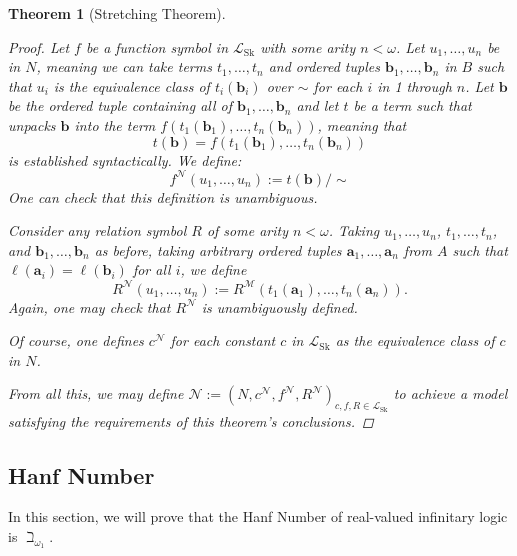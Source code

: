 \documentclass{amsart}
\newtheorem{theorem}{Theorem}[section]
\theoremstyle{definition}
\numberwithin{equation}{theorem}
\newcommand{\V}{\mathbf}
\newcommand{\len}{\ell}
\newcommand{\frag}{\mathcal{L}}
\newcommand{\fragsk}{\frag_{\text{Sk}}}
\begin{document}
\begin{theorem}[Stretching Theorem]
\begin{proof}
    Let $f$ be a function symbol in $\fragsk$ with some arity $n<\omega$.
    Let $u_1,\dots,u_n$ be in $N$, meaning we can take terms $t_1,\dots,t_n$ and ordered tuples $\V b_1,\dots,\V b_n$ in $B$ such that $u_i$ is the equivalence class of $t_i(\V b_i)$ over $\sim$ for each $i$ in 1 through $n$.
    Let $\V b$ be the ordered tuple containing all of $\V b_1,\dots,\V b_n$ and let $t$ be a term such that unpacks $\V b$ into the term $f(t_1(\V b_1),\dots,t_n(\V b_n))$, meaning that
    \[
      t(\V b)=f(t_1(\V b_1),\dots,t_n(\V b_n))
    \]
    is established syntactically.
    We define:
    \[
      f^\mathcal N(u_1,\dots, u_n):=t(\V b)/{\sim}
    \]
    One can check that this definition is unambiguous.
    
    Consider any relation symbol $R$ of some arity $n<\omega$.
    Taking $u_1,\dots,u_n$, $t_1,\dots,t_n$, and $\V b_1,\dots,\V b_n$ as before,
    taking arbitrary ordered tuples $\V a_1,\dots,\V a_n$ from $A$ such that $\len(\V a_i)=\len(\V b_i)$ for all $i$, we define
    \[
      R^\mathcal N(u_1,\dots,u_n):=R^\mathcal M(t_1(\V a_1),\dots,t_n(\V a_n)).
    \]
    Again, one may check that $R^\mathcal N$ is unambiguously defined.
    
    Of course, one defines $c^\mathcal N$ for each constant $c$ in $\fragsk$ as the equivalence class of $c$ in $N$.
    
    From all this, we may define $\mathcal N:=(N, c^\mathcal N, f^\mathcal N,R^\mathcal N)_{c,f,R\in\fragsk}$ to achieve a model satisfying the requirements of this theorem's conclusions.
  \end{proof}
\end{theorem}

\subsection{Hanf Number}

In this section, we will prove that the Hanf Number of real-valued infinitary logic is $\beth_{\omega_1}$.
\end{document}
